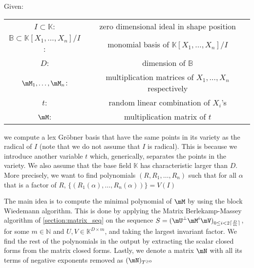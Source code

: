 \documentclass[12pt]{article}
\def\K{\mathbb{K}}
\def\K {\ensuremath{\mathbb{K}}}
\begin{document}
Given:
\begin{center}
	\begin{tabular}{c c}
		$I \subset \mathbb{K}$:& zero dimensional ideal
		in shape position\\
		$\mathbb{B} \subset \mathbb{K}[X_1,\dots,X_n]/I$:&
		monomial basis of $\mathbb{K}[X_1,\dots,X_n]/I$\\
		$D$: & dimension of $\mathbb{B}$\\
		$\mM_1, \dots,\mM_n$:& multiplication matrices of
		$X_1 ,\dots,X_n$ respectively\\
		$t$:& random linear combination of $X_i$'s\\
		$\mM$:& multiplication matrix of $t$
	\end{tabular}
\end{center}
we compute a lex Gr\"obner basis that have the same points
in its variety as the radical of $I$ 
(note that we do not assume that $I$ is radical).
This is because we introduce another variable $t$ which,
generically, separates the points in the variety.
We also assume that the base field $\K$ has characteristic
larger than $D$. More precisely, we want to find polynomials
$(R,R_1,\dots,R_n)$ such that for all $\alpha$ that is a factor of
$R$, $\{ (R_1(\alpha),\dots,R_n(\alpha)) \} = V(I)$

The main idea is to compute the minimal polynomial
of $\mM$ by using the block Wiedemann algorithm.
This is done by applying the Matrix Berlekamp-Massey algorithm of
\cref{section:matrix_seq} on the sequence 
$S = (\mU^{\perp}\mM^i\mV)_{0 \le i < 2 \lceil \frac{D}{m} \rceil}$,
for some $m \in \mathbb{N}$ and $U,V \in \mathbb{K}^{D \times m}$,
and taking the largest invariant factor.
We find the rest of the polynomials in the output by extracting
the scalar closed forms from the matrix closed forms. Lastly,
we denote a matrix $\mN$ with all its terms of negative exponents removed
as $ (\mN)_{T^{\ge 0}} $
\end{document}

